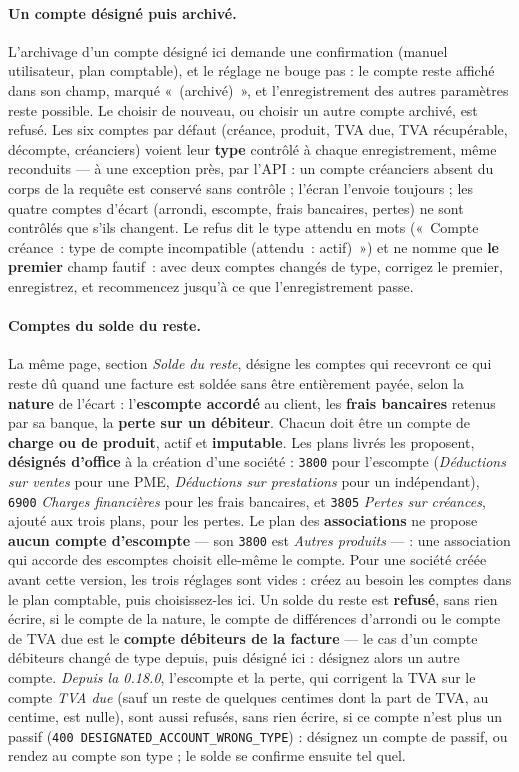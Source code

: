 \documentclass[a4paper,11pt,oneside]{article}
\begin{document}
\paragraph{Un compte désigné puis archivé.} L'archivage d'un compte désigné ici demande une confirmation (manuel utilisateur, plan comptable), et le réglage ne bouge pas : le compte reste affiché dans son champ, marqué «~(archivé)~», et l'enregistrement des autres paramètres reste possible. Le choisir de nouveau, ou choisir un autre compte archivé, est refusé. Les six comptes par défaut (créance, produit, TVA due, TVA récupérable, décompte, créanciers) voient leur \textbf{type} contrôlé à chaque enregistrement, même reconduits --- à une exception près, par l'API : un compte créanciers absent du corps de la requête est conservé sans contrôle ; l'écran l'envoie toujours ; les quatre comptes d'écart (arrondi, escompte, frais bancaires, pertes) ne sont contrôlés que s'ils changent. Le refus dit le type attendu en mots («~Compte créance~: type de compte incompatible (attendu~: actif)~») et ne nomme que \textbf{le premier} champ fautif~: avec deux comptes changés de type, corrigez le premier, enregistrez, et recommencez jusqu'à ce que l'enregistrement passe.

\paragraph{Comptes du solde du reste.} La même page, section \emph{Solde du reste}, désigne les comptes qui recevront ce qui reste dû quand une facture est soldée sans être entièrement payée, selon la \textbf{nature} de l'écart : l'\textbf{escompte accordé} au client, les \textbf{frais bancaires} retenus par sa banque, la \textbf{perte sur un débiteur}. Chacun doit être un compte de \textbf{charge ou de produit}, actif et \textbf{imputable}. Les plans livrés les proposent, \textbf{désignés d'office} à la création d'une société : \texttt{3800} pour l'escompte (\emph{Déductions sur ventes} pour une PME, \emph{Déductions sur prestations} pour un indépendant), \texttt{6900} \emph{Charges financières} pour les frais bancaires, et \texttt{3805} \emph{Pertes sur créances}, ajouté aux trois plans, pour les pertes. Le plan des \textbf{associations} ne propose \textbf{aucun compte d'escompte} --- son \texttt{3800} est \emph{Autres produits} --- : une association qui accorde des escomptes choisit elle-même le compte. Pour une société créée avant cette version, les trois réglages sont vides : créez au besoin les comptes dans le plan comptable, puis choisissez-les ici. Un solde du reste est \textbf{refusé}, sans rien écrire, si le compte de la nature, le compte de différences d'arrondi ou le compte de TVA due est le \textbf{compte débiteurs de la facture} --- le cas d'un compte débiteurs changé de type depuis, puis désigné ici : désignez alors un autre compte. \emph{Depuis la 0.18.0}, l'escompte et la perte, qui corrigent la TVA sur le compte \emph{TVA due} (sauf un reste de quelques centimes dont la part de TVA, au centime, est nulle), sont aussi refusés, sans rien écrire, si ce compte n'est plus un passif (\texttt{400 DESIGNATED\_ACCOUNT\_WRONG\_TYPE}) : désignez un compte de passif, ou rendez au compte son type ; le solde se confirme ensuite tel quel.
\end{document}
